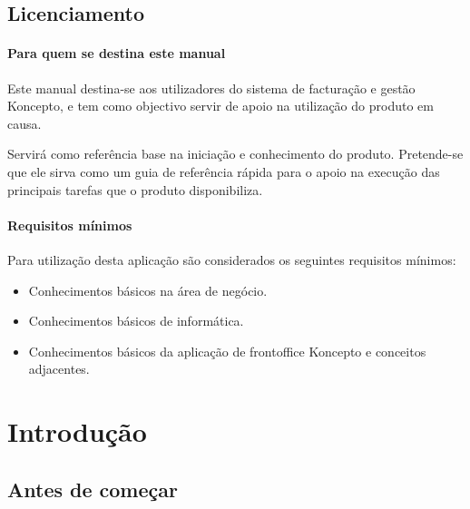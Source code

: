 \documentclass[a4paper,11pt,openany]{memoir}
\begin{document}
\mainmatter

\chapter{Licenciamento}
%


\subsection{Para quem se destina este manual}

Este manual destina-se aos utilizadores do sistema de facturação e gestão Koncepto,
e  tem como objectivo servir de apoio na utilização do produto em causa.

Servirá como referência base na iniciação e conhecimento do produto. Pretende-se
que ele sirva como um guia de referência rápida para o apoio na execução das
principais tarefas que o produto disponibiliza.



\subsection{Requisitos mínimos}

Para utilização desta aplicação são considerados os seguintes requisitos mínimos:
\begin{itemize}
\item Conhecimentos básicos na área de negócio.
\item Conhecimentos básicos de informática.
\item Conhecimentos básicos da aplicação de frontoffice Koncepto e conceitos adjacentes.
\end{itemize}





\newpage
\part{Introdução}

\chapter{Antes de começar}
\end{document}
